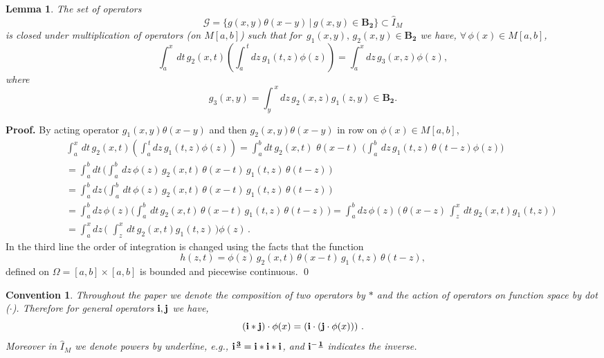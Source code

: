 \documentclass[10pt]{article}
\newcommand{\be}{\begin{equation}}
\newcommand{\ee}{\end{equation}}
\newcommand{\bea}{\begin{eqnarray}}
\newcommand{\eea}{\end{eqnarray}}
\newcommand{\nn}{\nonumber}
\newcommand{\mIm}{\widehat{I}_{M}}
\newtheorem{lem}{Lemma}
\newtheorem*{con}{Convention}
\begin{document}
\begin{lem}\label{lemf4}{The set of operators \be\mathcal{G}=\{ g(x,y) \theta(x-y)\, | \,g(x,y)\in
\boldsymbol{B_2}\}\subset \mIm\nn\ee is closed under multiplication
of operators (on $M[a,b]$) such that for
$\,g_{1}(x,y),\,g_{2}(x,y)\in {\boldsymbol{B_2}}$ we have,
$\forall\, \phi(x)\in M[a,b]$, \be\int^{x}_{a}\, dt \,
g_2(x,t)(\int^{\,t}_{a} dz\, g_1(t,z)\phi (z)) \nn = \int^{x}_{a}
dz\, g_3(x,z) \phi (z),\nn\ee where \be g_{3}(x, y)=\int^{\,x}_{y}
dz\,g_2(x,z) g_1(z,y)\in {\boldsymbol {B_2}}. \nn\ee}
\end{lem}

{\bf Proof.} {By acting operator $g_1(x,y)\theta(x-y)$ and then
$g_2(x,y)\theta(x-y)$ in row on $\phi(x)\in M[a,b]$, \bea
&&\int^{x}_{a}\, dt \, g_2(x,t)(\int^{\,t}_{a} dz\, g_1(t,z)\phi
(z))={\int^{b}_{a}} dt
\,g_2(x,t)\,\,\theta(x-t)\,\,\big({\int^{b}_{a}}\,dz\,g_1(t,z)\,\theta(t-z)\phi(z)\big)
\nn\\&&={\int^{b}_{a}} dt\, \big({\int^{b}_{a}}\, d z\,\phi(z)\,
g_2(x,t)\,\theta(x-t)
\,g_1(t,z)\,\theta(t-z)\,\big)\nn\\&&={\int^{b}_{a}} dz\,
\big({\int^{b}_{a}}\, d t\,\phi(z)\, g_2(x,t)\,\theta(x-t)
\,g_1(t,z)\,\theta(t-z)\,\big)\nn\\&&={\int^{b}_{a}} dz\,
\phi(z)\big({\int^{b}_{a}}\, d t\, g_2(x,t)\,\theta(x-t)
\,g_1(t,z)\,\theta(t-z)\,\big)={\int^{b}_{a}}
dz\,\phi(z)\,\big(\,\theta(x-z)\,{\int^{x}_{z}}\, d t\,
g_2(x,t)g_1(t,z)\,\big)\nn\\&&={\int^{x}_{a}}
dz\,(\,\,{\int^{x}_{z}}\, d t\,
g_2(x,t)g_1(t,z)\,\big)\phi(z)\,.\nn\eea} In the third line the
order of integration is changed using the facts that the function
\be h(z,t)=\phi(z)\, g_2(x,t)\,\theta(x-t)
\,g_1(t,z)\,\theta(t-z),\nn\ee defined on $\Omega=[a,b]\times[a,b]$
is bounded and piecewise continuous. \qed

\begin{con}\label{char}{Throughout the paper we denote the
composition of two operators by $*$ and the action of operators on
function space by dot ($\cdot$). Therefore for general operators
${\bf{i}}, {\bf{j}}$ we have, \be({\bf{i}}*{\bf{j}})\cdot
\phi(x)=({\bf{i}}\cdot({\bf{j}}\cdot\phi(x)))\,\,.
\nn\label{four}\ee Moreover in $\mIm$ we denote powers by underline,
e.g., $\bf{i}^{\,\underline 3}=\bf{i}*\bf{i}*\bf{i}$}, and
$\bf{i}^{-\,\underline 1}$ indicates the inverse.  \end{con}
\end{document}
